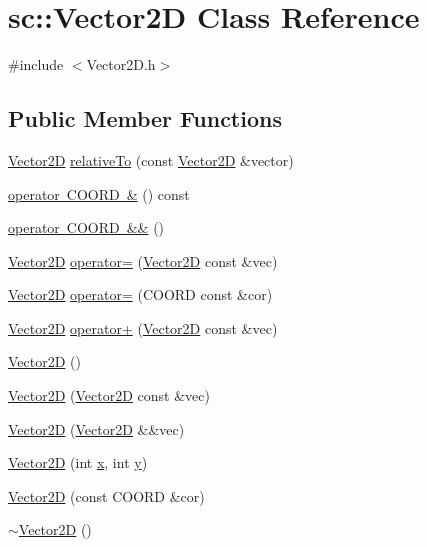 \hypertarget{classsc_1_1_vector2_d}{}\section{sc\+::Vector2D Class Reference}
\label{classsc_1_1_vector2_d}


{\ttfamily \#include $<$Vector2\+D.\+h$>$}

\subsection*{Public Member Functions}
\begin{DoxyCompactItemize}
\item 
\mbox{\hyperlink{classsc_1_1_vector2_d}{Vector2D}} \mbox{\hyperlink{classsc_1_1_vector2_d_ae9545c1e00d00d200ce6f4f361a8aab4}{relative\+To}} (const \mbox{\hyperlink{classsc_1_1_vector2_d}{Vector2D}} \&vector)
\item 
\mbox{\hyperlink{classsc_1_1_vector2_d_a2627046fe1d81433b912aeb48fef0a62}{operator C\+O\+O\+R\+D \&}} () const
\item 
\mbox{\hyperlink{classsc_1_1_vector2_d_af7e085bf106e0862ed9f5ef405ad9ac3}{operator C\+O\+O\+R\+D \&\&}} ()
\item 
\mbox{\hyperlink{classsc_1_1_vector2_d}{Vector2D}} \mbox{\hyperlink{classsc_1_1_vector2_d_acb37f78eb97a116c0a730d0b9d29d13c}{operator=}} (\mbox{\hyperlink{classsc_1_1_vector2_d}{Vector2D}} const \&vec)
\item 
\mbox{\hyperlink{classsc_1_1_vector2_d}{Vector2D}} \mbox{\hyperlink{classsc_1_1_vector2_d_a8ea3728d35dea49a06d469f279764535}{operator=}} (C\+O\+O\+RD const \&cor)
\item 
\mbox{\hyperlink{classsc_1_1_vector2_d}{Vector2D}} \mbox{\hyperlink{classsc_1_1_vector2_d_a917436c73b19026a3c0f30b5d6451cf7}{operator+}} (\mbox{\hyperlink{classsc_1_1_vector2_d}{Vector2D}} const \&vec)
\item 
\mbox{\hyperlink{classsc_1_1_vector2_d_a98e9997ebb7a629f4db52397d4e0d653}{Vector2D}} ()
\item 
\mbox{\hyperlink{classsc_1_1_vector2_d_a6be27d00722f8899b4f205010b0a17e7}{Vector2D}} (\mbox{\hyperlink{classsc_1_1_vector2_d}{Vector2D}} const \&vec)
\item 
\mbox{\hyperlink{classsc_1_1_vector2_d_ab9cb563219c3b9f5156c403a92ed4181}{Vector2D}} (\mbox{\hyperlink{classsc_1_1_vector2_d}{Vector2D}} \&\&vec)
\item 
\mbox{\hyperlink{classsc_1_1_vector2_d_a583d35d50c7f91179c9b9ef73f397cbc}{Vector2D}} (int \mbox{\hyperlink{classsc_1_1_vector2_d_aa7b06387b89f15a07dfcd5ad401b021e}{x}}, int \mbox{\hyperlink{classsc_1_1_vector2_d_ac1c2d0950e1e5903f8032cfb327ca1b1}{y}})
\item 
\mbox{\hyperlink{classsc_1_1_vector2_d_a5679ccdf1c3ea3a125a79f88e2f39c79}{Vector2D}} (const C\+O\+O\+RD \&cor)
\item 
\mbox{\hyperlink{classsc_1_1_vector2_d_ac0f819527d3966874c4c9bb72ab9f67e}{$\sim$\+Vector2D}} ()
\end{DoxyCompactItemize}
